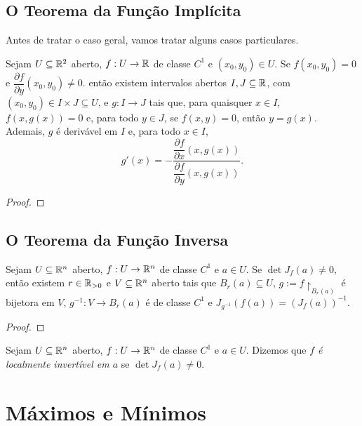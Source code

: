 \subsection{O Teorema da Função Implícita}

Antes de tratar o caso geral, vamos tratar alguns casos particulares.

\begin{theorem}
    Sejam $U \subseteq \mathbb{R}^2$ aberto, $f : U \to \mathbb{R}$ de classe $C^1$ e $(x_0,y_0) \in U$. Se $f(x_0,y_0) = 0$ e $\dfrac{\partial f}{\partial y}(x_0, y_0) \neq 0$. então existem intervalos abertos $I,J \subseteq \mathbb{R}$, com $(x_0, y_0) \in I \times J \subseteq U$, e $g : I \to J$ tais que, para quaisquer $x \in I$, $f(x,g(x)) = 0$ e, para todo $y \in J$, se $f(x,y) = 0$, então $y=g(x)$. Ademais, $g$ é derivável em $I$ e, para todo $x \in I$,
        \[
            g'(x) = - \dfrac{\dfrac{\partial f}{\partial x}(x,g(x))}{\dfrac{\partial f}{\partial y}(x,g(x))}.
        \]
\end{theorem}

\begin{proof}
    \blackproof
\end{proof}

\subsection{O Teorema da Função Inversa}

\begin{theorem}
    Sejam $U \subseteq \mathbb{R}^n$ aberto, $f : U \to \mathbb{R}^n$ de classe $C^1$ e $a \in U$. Se $\det J_f(a) \neq 0$, então existem $r \in \mathbb{R}_{>0}$ e $V \subseteq \mathbb{R}^n$ aberto tais que $B_r(a) \subseteq U$, $g := f \restriction_{B_r(a)}$ é bijetora em $V$, $g^{-1} : V \to B_r(a)$ é de classe $C^1$ e $J_{g^{-1}}(f(a)) = \left( J_f(a) \right)^{-1}$.
\end{theorem}

\begin{proof}
    \blackproof
\end{proof}

\begin{definition}
    Sejam $U \subseteq \mathbb{R}^n$ aberto, $f : U \to \mathbb{R}^n$ de classe $C^1$ e $a \in U$. Dizemos que \emph{$f$ é localmente invertível em $a$} se $\det J_f(a) \neq 0$.
\end{definition}

\section{Máximos e Mínimos}


